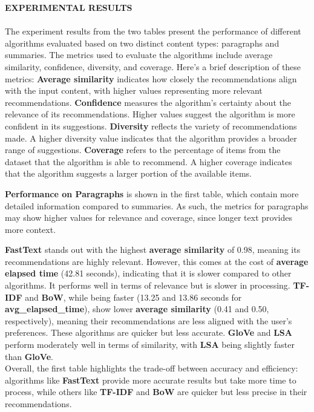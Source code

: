 \documentclass[10pt, oneside,english,hidelinks,a4paper]{article}
\begin{document}

\begin{multicols}{2}


\noindent
\textbf{EXPERIMENTAL RESULTS}\\\\
%
The experiment results from the two tables present the performance of different algorithms evaluated based on two distinct content types: paragraphs and summaries. The metrics used to evaluate the algorithms include average similarity, confidence, diversity, and coverage. Here's a brief description of these metrics:
\textbf{Average similarity} indicates how closely the recommendations align with the input content, with higher values representing more relevant recommendations. \textbf{Confidence} measures the algorithm’s certainty about the relevance of its recommendations. Higher values suggest the algorithm is more confident in its suggestions. \textbf{Diversity} reflects the variety of recommendations made. A higher diversity value indicates that the algorithm provides a broader range of suggestions.
\textbf{Coverage} refers to the percentage of items from the dataset that the algorithm is able to recommend. A higher coverage indicates that the algorithm suggests a larger portion of the available items.

\noindent
\textbf{Performance on Paragraphs} is shown in the first table, which contain more detailed information compared to summaries. As such, the metrics for paragraphs may show higher values for relevance and coverage, since longer text provides more context.

\noindent
\textbf{FastText} stands out with the highest \textbf{average similarity} of 0.98, meaning its recommendations are highly relevant. However, this comes at the cost of \textbf{average elapsed time} (42.81 seconds), indicating that it is slower compared to other algorithms. It performs well in terms of relevance but is slower in processing. \textbf{TF-IDF} and \textbf{BoW}, while being faster (13.25 and 13.86 seconds for \textbf{avg\_elapsed\_time}), show lower \textbf{average similarity} (0.41 and 0.50, respectively), meaning their recommendations are less aligned with the user’s preferences. These algorithms are quicker but less accurate. \textbf{GloVe} and \textbf{LSA} perform moderately well in terms of similarity, with \textbf{LSA} being slightly faster than \textbf{GloVe}.\\
Overall, the first table highlights the trade-off between accuracy and efficiency: algorithms like \textbf{FastText} provide more accurate results but take more time to process, while others like \textbf{TF-IDF} and \textbf{BoW} are quicker but less precise in their recommendations.


\end{multicols}
\end{document}
